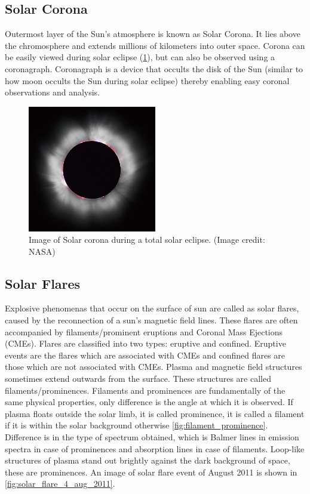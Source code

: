 \message{ !name(main.tex)}\documentclass[12pt]{article}
\begin{document}
\subsection{Solar Corona}

Outermost layer of the Sun's atmosphere is known as Solar Corona. It lies above the chromosphere and extends millions of kilometers into outer space. Corona can be easily viewed during solar eclipse (\cref{fig:corona_eclipse}), but can also be observed using a coronagraph. Coronagraph is a device that occults the disk of the Sun (similar to how moon occults the Sun during solar eclipse) thereby enabling easy coronal observations and analysis.

\begin{figure}[h!]
    \centering
    \includegraphics[width=0.5\textwidth]{images/corona.jpg}
    \caption[Image of Solar corona during a total solar eclipse]{Image of Solar corona during a total solar eclipse. (Image credit: NASA)}
    \label{fig:corona_eclipse}
\end{figure}


\subsection{Solar Flares}

Explosive phenomenas that occur on the surface of sun are called as solar flares, caused by the reconnection of a sun's magnetic field lines. These flares are often accompanied by filaments/prominent eruptions and Coronal Mass Ejections (CMEs). Flares are classified into two types: eruptive and confined. Eruptive events are the flares which are associated with CMEs and confined flares are those which are not associated with CMEs. Plasma and magnetic field structures sometimes extend outwards from the surface. These structures are called filaments/prominences. Filaments and prominences are fundamentally of the same physical properties, only difference is the angle at which it is observed. If plasma floats outside the solar limb, it is called prominence, it is called a filament if it is within the solar background otherwise \cref{fig:filament_prominence}. Difference is in the type of spectrum obtained, which is Balmer lines in emission spectra in case of prominences and absorption lines in case of filaments. Loop-like structures of plasma stand out brightly against the dark background of space, these are prominences. An image of solar flare event of  August 2011 is shown in \cref{fig:solar_flare_4_aug_2011}.
\end{document}
